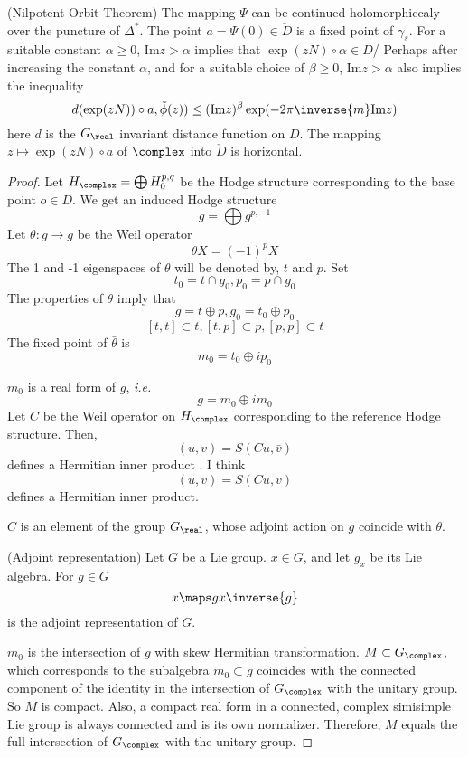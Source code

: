 \documentclass{article}
\begin{document}
\newcommand{\Im}{\text{Im}}
\begin{theorem}(Nilpotent Orbit Theorem)
The mapping $\Psi$ can be continued holomorphiccaly over the puncture of $\Delta^*$.
The point $a = \Psi(0) \in \check{D}$ is a fixed point of $\gamma_s$. 
For a suitable constant $\alpha \ge 0$, $\Im z > \alpha$ implies that $\exp(zN)\circ\alpha
\in D$/ Perhaps after increasing the constant $\alpha$, and for a suitable choice of 
$\beta \ge 0$, $\Im z > \alpha$ also implies the inequality
\[
    d(\exp(zN))\circ a, \tilde{\phi}(z)) \le (\Im z)^{\beta}\exp(-2\pi\inverse{m}\Im z)
\]
here $d$ is the $G_{\real}$ invariant distance function on $D$. The mapping
$z \mapsto \exp(zN)\circ a$ of $\complex$ into $\check{D}$ is horizontal.
\end{theorem}
\begin{proof}
Let $H_{\complex} = \bigoplus H_0^{p,q}$ be the Hodge structure corresponding to the 
base point $o \in D$. We get an induced Hodge structure
\[
    g = \bigoplus g^{p,-1}
\]
Let $\theta: g \rightarrow g$ be the Weil operator
\[
    \theta X = (-1)^pX
\]
The 1 and -1 eigenspaces of $\theta$ will be denoted by, $t$ and $p$. Set
\[
    t_0 = t\cap g_0, p_0 = p\cap g_0
\]
The properties of $\theta$ imply that
\[
    g = t\oplus p, g_0 = t_0\oplus p_0
\]
\[
    [t,t]\subset t, [t,p]\subset p, [p,p]\subset t
\]
The fixed point of $\bar{\theta}$ is 
\[
    m_0 = t_0\oplus ip_0
\]

$m_0$ is a real form of $g$, \emph{i.e.}
\[
    g = m_0\oplus im_0
\]
Let $C$ be the Weil operator on $H_{\complex}$ corresponding to the reference Hodge
structure. Then,
\[
    (u, v) = S(Cu,\bar{v})
\]
defines a Hermitian inner product . I think
\[
    (u, v) = S(Cu, v)
\]
defines a Hermitian inner product. 

$C$ is an element of the group $G_{\real}$, whose adjoint action on $g$ coincide with
$\theta$.
\begin{definition}(Adjoint representation)
Let $G$ be a Lie group. $x \in G$, and let $g_x$ be its Lie algebra. For $g\in G$
\[
    x \maps gx\inverse{g}
\]
is the adjoint representation of $G$.
\end{definition}
$m_0$ is the intersection of $g$ with skew Hermitian transformation. 
$M \subset G_{\complex}$, which corresponds to the subalgebra $m_0 \subset g$ coincides 
with the connected component of the identity in the intersection of $G_{\complex}$ with
the unitary group. So $M$ is compact. Also, a compact real form in a connected, 
complex simisimple Lie group is always connected and is its own normalizer. Therefore, 
$M$ equals the full intersection of $G_{\complex}$ with the unitary group.


\end{proof}
\end{document}
